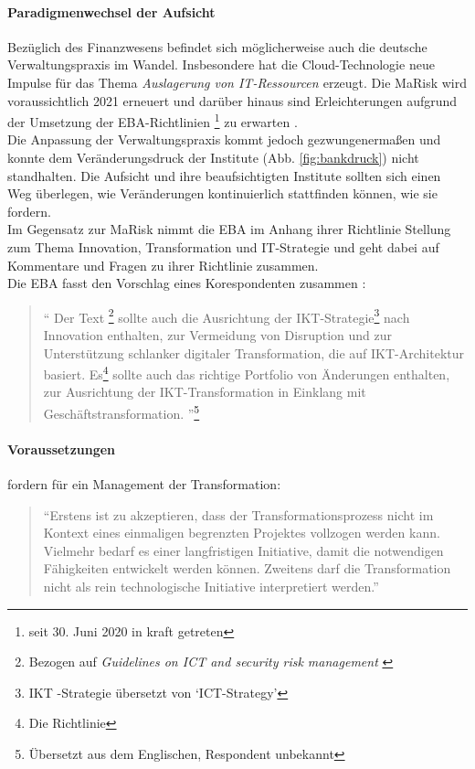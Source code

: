 \paragraph{Paradigmenwechsel der Aufsicht}
Bezüglich des Finanzwesens befindet sich möglicherweise auch die deutsche Verwaltungspraxis im Wandel. Insbesondere hat die Cloud-Technologie neue Impulse für das Thema \emph{Auslagerung von IT-Ressourcen \cite{MaRisk:2017, BAIT:2018}} erzeugt. Die \ac{MaRisk} wird voraussichtlich 2021 erneuert und darüber hinaus sind Erleichterungen aufgrund der Umsetzung der EBA-Richtlinien \cite{eba:2019}\footnote{seit 30. Juni 2020 in kraft getreten} zu erwarten \cite{BaFin:marisk-novelle}. 
\medskip
\\
Die Anpassung der Verwaltungspraxis kommt jedoch gezwungenermaßen und konnte dem Veränderungsdruck der Institute (Abb. \ref{fig:bankdruck}) nicht standhalten. Die Aufsicht und ihre beaufsichtigten Institute sollten sich einen Weg überlegen, wie Veränderungen kontinuierlich stattfinden können, wie sie \citet{Bussmann2006} fordern.
\medskip
\\
Im Gegensatz zur \ac{MaRisk} nimmt die \ac{EBA} im Anhang ihrer Richtlinie \cite{eba:2019} Stellung zum Thema Innovation, Transformation und IT-Strategie und geht dabei auf Kommentare und Fragen zu ihrer Richtlinie zusammen.
\medskip
\\
Die \ac{EBA} fasst den Vorschlag eines Korespondenten zusammen \cite[S. 50]{eba:2019}:
\begin{quote}
    \enquote{
Der Text
\footnote{Bezogen auf \emph{Guidelines on ICT and security risk
management
} \cite[S. 14ff]{eba:2019}} 
sollte auch die Ausrichtung der IKT-Strategie\footnote{\ac{IKT} -Strategie übersetzt von \enquote{ICT-Strategy}} nach Innovation enthalten, zur Vermeidung von Disruption und zur Unterstützung schlanker digitaler Transformation, die auf \ac{IKT}-Architektur basiert. Es\footnote{Die Richtlinie} sollte auch das richtige Portfolio von Änderungen enthalten, zur Ausrichtung der \ac{IKT}-Transformation in Einklang mit Geschäftstransformation.
    }\footnote{Übersetzt aus dem Englischen, Respondent unbekannt}
\end{quote}

\paragraph{Voraussetzungen}
\citet[11.4.1]{Koch2016} fordern für ein Management der Transformation:
\begin{quote}
    \enquote{Erstens ist zu akzeptieren, dass der
Transformationsprozess nicht im Kontext eines einmaligen begrenzten Projektes vollzogen
werden kann. Vielmehr bedarf es einer langfristigen Initiative, damit die notwendigen
Fähigkeiten entwickelt werden können. Zweitens darf die Transformation nicht als rein
technologische Initiative interpretiert werden.}
\end{quote}

